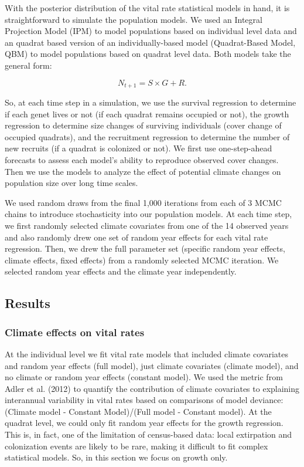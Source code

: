\documentclass[12pt,]{article}
\begin{document}
With the posterior distribution of the vital rate statistical models in
hand, it is straightforward to simulate the population models. We used
an Integral Projection Model (IPM) to model populations based on
individual level data and an quadrat based version of an
individually-based model (Quadrat-Based Model, QBM) to model populations
based on quadrat level data. Both models take the general form:

\begin{equation}
N_{t+1} = S \times G + R.
\end{equation}

So, at each time step in a simulation, we use the survival regression to
determine if each genet lives or not (if each quadrat remains occupied
or not), the growth regression to determine size changes of surviving
individuals (cover change of occupied quadrats), and the recruitment
regression to determine the number of new recruits (if a quadrat is
colonized or not). We first use one-step-ahead forecasts to assess each
model's ability to reproduce observed cover changes. Then we use the
models to analyze the effect of potential climate changes on population
size over long time scales.

We used random draws from the final 1,000 iterations from each of 3 MCMC
chains to introduce stochasticity into our population models. At each
time step, we first randomly selected climate covariates from one of the
14 observed years and also randomly drew one set of random year effects
for each vital rate regression. Then, we drew the full parameter set
(specific random year effects, climate effects, fixed effects) from a
randomly selected MCMC iteration. We selected random year effects and
the climate year independently.

\subsection{Results}\label{results}

\subsubsection{Climate effects on vital
rates}\label{climate-effects-on-vital-rates}

At the individual level we fit vital rate models that included climate
covariates and random year effects (full model), just climate covariates
(climate model), and no climate or random year effects (constant model).
We used the metric from Adler et al. (2012) to quantify the contribution
of climate covariates to explaining interannual variability in vital
rates based on comparisons of model deviance: (Climate model - Constant
Model)/(Full model - Constant model). At the quadrat level, we could
only fit random year effects for the growth regression. This is, in
fact, one of the limitation of census-based data: local extirpation and
colonization events are likely to be rare, making it difficult to fit
complex statistical models. So, in this section we focus on growth only.
\end{document}
